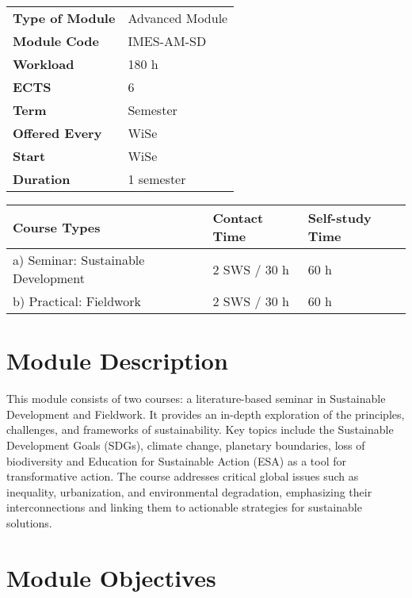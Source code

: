 \documentclass[
  letterpaper,
  10pt,
  openany]{book}
\begin{document}
\begin{longtable}[]{@{}ll@{}}
\toprule\noalign{}
\endhead
\bottomrule\noalign{}
\endlastfoot
\textbf{Type of Module} & Advanced Module \\
\textbf{Module Code} & IMES-AM-SD \\
\textbf{Workload} & 180 h \\
\textbf{ECTS} & 6 \\
\textbf{Term} & Semester \\
\textbf{Offered Every} & WiSe \\
\textbf{Start} & WiSe \\
\textbf{Duration} & 1 semester \\
\end{longtable}

\begin{longtable}[]{@{}lll@{}}
\toprule\noalign{}
Course Types & Contact Time & Self-study Time \\
\midrule\noalign{}
\endhead
\bottomrule\noalign{}
\endlastfoot
a) Seminar: Sustainable Development & 2 SWS / 30 h & 60 h \\
b) Practical: Fieldwork & 2 SWS / 30 h & 60 h \\
\end{longtable}

\section*{Module Description}\label{module-description-1}


This module consists of two courses: a literature-based seminar in
Sustainable Development and Fieldwork. It provides an in-depth
exploration of the principles, challenges, and frameworks of
sustainability. Key topics include the Sustainable Development Goals
(SDGs), climate change, planetary boundaries, loss of biodiversity and
Education for Sustainable Action (ESA) as a tool for transformative
action. The course addresses critical global issues such as inequality,
urbanization, and environmental degradation, emphasizing their
interconnections and linking them to actionable strategies for
sustainable solutions.

\section*{Module Objectives}\label{module-objectives}
\end{document}
